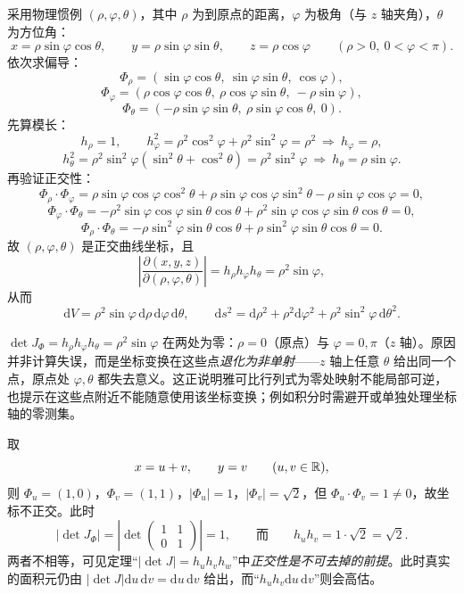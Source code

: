 \begin{example}[球坐标]
采用物理惯例 \((\rho,\varphi,\theta)\)，其中 \(\rho\) 为到原点的距离，\(\varphi\) 为极角（与 \(z\) 轴夹角），\(\theta\) 为方位角：
\[
x=\rho\sin\varphi\cos\theta,\qquad
y=\rho\sin\varphi\sin\theta,\qquad
z=\rho\cos\varphi\qquad(\rho>0,\ 0<\varphi<\pi).
\]
依次求偏导：
\[
\Phi_\rho=(\sin\varphi\cos\theta,\ \sin\varphi\sin\theta,\ \cos\varphi),
\]
\[
\Phi_\varphi=(\rho\cos\varphi\cos\theta,\ \rho\cos\varphi\sin\theta,\ -\rho\sin\varphi),
\]
\[
\Phi_\theta=(-\rho\sin\varphi\sin\theta,\ \rho\sin\varphi\cos\theta,\ 0).
\]
先算模长：
\[
h_\rho=1,\qquad
h_\varphi^2=\rho^2\cos^2\varphi+\rho^2\sin^2\varphi=\rho^2\ \Rightarrow\ h_\varphi=\rho,
\]
\[
h_\theta^2=\rho^2\sin^2\varphi(\sin^2\theta+\cos^2\theta)=\rho^2\sin^2\varphi\ \Rightarrow\ h_\theta=\rho\sin\varphi .
\]
再验证正交性：
\[
\Phi_\rho\cdot\Phi_\varphi=\rho\sin\varphi\cos\varphi\cos^2\theta+\rho\sin\varphi\cos\varphi\sin^2\theta-\rho\sin\varphi\cos\varphi=0,
\]
\[
\Phi_\varphi\cdot\Phi_\theta=-\rho^2\sin\varphi\cos\varphi\sin\theta\cos\theta+\rho^2\sin\varphi\cos\varphi\sin\theta\cos\theta=0,
\]
\[
\Phi_\rho\cdot\Phi_\theta=-\rho\sin^2\varphi\sin\theta\cos\theta+\rho\sin^2\varphi\sin\theta\cos\theta=0 .
\]
故 \((\rho,\varphi,\theta)\) 是正交曲线坐标，且
\[
\left|\frac{\partial(x,y,z)}{\partial(\rho,\varphi,\theta)}\right|
=h_\rho h_\varphi h_\theta=\rho^2\sin\varphi ,
\]
从而
\[
\mathrm{d}V=\rho^2\sin\varphi\,\mathrm{d}\rho\,\mathrm{d}\varphi\,\mathrm{d}\theta,\qquad
\mathrm{d}s^2=\mathrm{d}\rho^2+\rho^2\mathrm{d}\varphi^2+\rho^2\sin^2\varphi\,\mathrm{d}\theta^2 .
\]
\end{example}

\begin{remark}[几何直观与奇点]
\(\det J_\Phi=h_\rho h_\varphi h_\theta=\rho^2\sin\varphi\) 在两处为零：\(\rho=0\)（原点）与 \(\varphi=0,\pi\)（\(z\) 轴）。原因并非计算失误，而是坐标变换在这些点\emph{退化为非单射}——\(z\) 轴上任意 \(\theta\) 给出同一个点，原点处 \(\varphi,\theta\) 都失去意义。这正说明雅可比行列式为零处映射不能局部可逆，也提示在这些点附近不能随意使用该坐标变换；例如积分时需避开或单独处理坐标轴的零测集。
\end{remark}

\begin{example}
取
\[
x=u+v,\qquad y=v\qquad(u,v\in\mathbb{R}),
\]
则 \(\Phi_u=(1,0)\)，\(\Phi_v=(1,1)\)，\(\left|\Phi_u\right|=1\)，\(\left|\Phi_v\right|=\sqrt2\)，但 \(\Phi_u\cdot\Phi_v=1\ne0\)，故坐标不正交。此时
\[
\left|\det J_\Phi\right|=\left|\det\begin{pmatrix}1&1\\0&1\end{pmatrix}\right|=1,
\qquad\text{而}\qquad h_uh_v=1\cdot\sqrt2=\sqrt2 .
\]
两者不相等，可见定理“\(\left|\det J\right|=h_uh_vh_w\)”中\emph{正交性是不可去掉的前提}。此时真实的面积元仍由 \(\left|\det J\right|\mathrm{d}u\,\mathrm{d}v=\mathrm{d}u\,\mathrm{d}v\) 给出，而“\(h_uh_v\mathrm{d}u\,\mathrm{d}v\)”则会高估。
\end{example}

